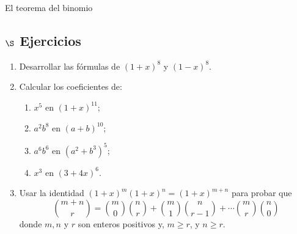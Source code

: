 \begin{section}{El teorema del binomio}
\subsection*{$\S$ Ejercicios}\label{ej3.6.1}
\begin{enumerate}
\item Desarrollar las fórmulas de $(1+x)^8$ y $(1-x)^8$.

\item Calcular los coeficientes de:
\begin{multicols}{2}
\begin{enumerate}
    \item $x^5$ en $(1+x)^{11}$;
    
    \item $a^2b^8 $ en $(a+b)^{10}$;
    
    \item $a^6 b^6$ en $(a^2 +b^3)^5$;
    
    \item $x^3$ en $(3+4x)^6$.
\end{enumerate}    
\end{multicols}
\item Usar la identidad $(1+x)^m(1+x)^n=(1+x)^{m+n}$ para probar que
$$
\binom{m+n}{r} =
\binom{m}{0}\binom{n}{r}+\binom{m}{1}\binom{n}{r-1}+\cdots
\binom{m}{r}\binom{n}{0}
$$
donde $m,n$ y $r$ son enteros positivos y, $m\ge r$, y $n \ge r$.
\end{enumerate}
\end{section}

